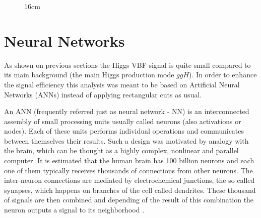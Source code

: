 \begin{figure}[hbtp]{16cm}
	\label{fig:control_plots}		
\end{figure}


\chapter{Neural Networks}
\label{sec:neural_networks}
As shown on previous sections the Higgs VBF signal is quite small compared to its main background (the main Higgs production mode $ggH$). In order to enhance the signal efficiency this analysis was meant to be based on Artificial Neural Networks (ANNs) instead of applying rectangular cuts as usual. 

An ANN (frequently referred just as neural network - NN) is an interconnected assembly of small processing units usually called neurons (also activations or nodes). Each of these units performs individual operations and communicates between themselves their results. Such a design was motivated by analogy with
the brain, which can be thought as a highly complex, nonlinear and parallel computer. It is estimated that the human brain has 100 billion neurons and each one of them typically receives thousands of connections from other neurons. The inter-neuron connections are mediated by electrochemical junctions, the so called synapses, which happens on branches of the cell called dendrites. These thousand of signals are then combined and depending of the result of this combination the neuron outputs a signal to its neighborhood \cite{bib:SimonHaykin,bib:KevinGurney}.

